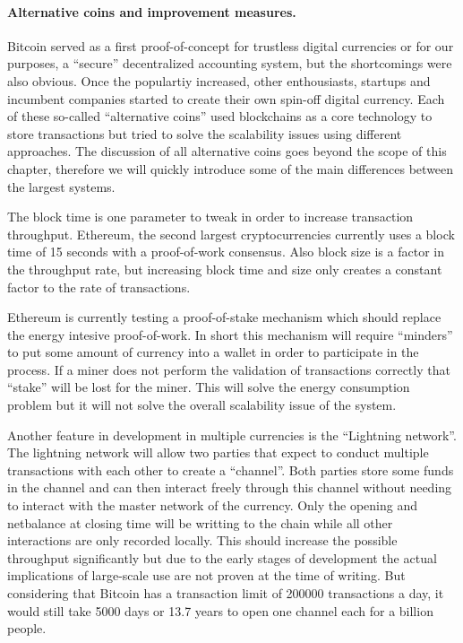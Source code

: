 \paragraph{Alternative coins and improvement measures.}
Bitcoin served as a first proof-of-concept for trustless digital currencies or for our purposes, a
``secure'' decentralized accounting system, but the shortcomings were also obvious. Once the 
populartiy increased, other enthousiasts, startups and incumbent companies started to create their 
own spin-off digital currency. Each of these so-called ``alternative coins'' used blockchains as 
a core technology to store transactions but tried to solve the scalability issues using different 
approaches. The discussion of all alternative coins goes beyond the scope of this chapter, therefore
we will quickly introduce some of the main differences between the largest systems. 

The block time is one parameter to tweak in order to increase transaction throughput. Ethereum, the
second largest cryptocurrencies currently uses a block time of 15 seconds with a proof-of-work 
consensus. Also block size is a factor in the throughput rate, but increasing block time and size 
only creates a constant factor to the rate of transactions.

Ethereum is currently testing a proof-of-stake mechanism which should replace the energy intesive 
proof-of-work. In short this mechanism will require ``minders'' to put some amount of currency into
a wallet in order to participate in the process. If a miner does not perform the validation of 
transactions correctly that ``stake'' will be lost for the miner. This will solve the energy 
consumption problem but it will not solve the overall scalability issue of the system. 

Another feature in development in multiple currencies is the ``Lightning network''. The lightning 
network will allow two parties that expect to conduct multiple transactions with each other to 
create a ``channel''. Both parties store some funds in the channel and can then interact freely 
through this channel without needing to interact with the master network of the currency. Only the
opening and netbalance at closing time will be writting to the chain while all other interactions 
are only recorded locally. This should increase the possible throughput significantly but due to the
early stages of development the actual implications of large-scale use are not proven at the time of
writing. But considering that Bitcoin has a transaction limit of 200000 transactions a day, it would 
still take 5000 days or 13.7 years to open one channel each for a billion people.

